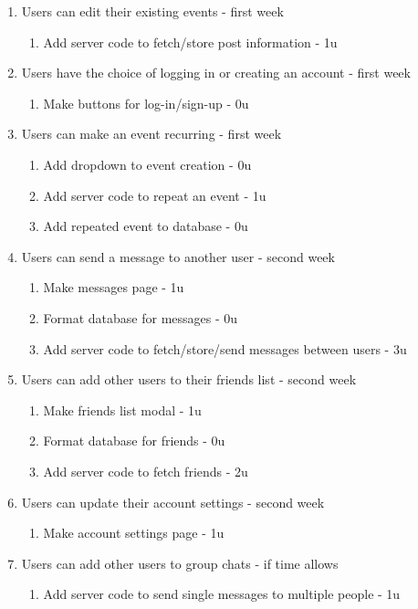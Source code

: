 \documentclass[a4paper]{article}
\begin{document}
\begin{enumerate}
\item Users can edit their existing events - first week
\begin{enumerate}
\item Add server code to fetch/store post information - 1u
\end{enumerate}

\item Users have the choice of logging in or creating an account - first week
\begin{enumerate}
\item Make buttons for log-in/sign-up - 0u
\end{enumerate}

\item Users can make an event recurring - first week
\begin{enumerate}
\item Add dropdown to event creation - 0u
\item Add server code to repeat an event - 1u
\item Add repeated event to database - 0u
\end{enumerate}

\item Users can send a message to another user - second week
\begin{enumerate}
\item Make messages page - 1u
\item Format database for messages - 0u
\item Add server code to fetch/store/send messages between users - 3u
\end{enumerate}

\item Users can add other users to their friends list - second week
\begin{enumerate}
\item Make friends list modal - 1u
\item Format database for friends - 0u
\item Add server code to fetch friends - 2u
\end{enumerate}

\item Users can update their account settings - second week
\begin{enumerate}
\item Make account settings page - 1u
\end{enumerate}

\item Users can add other users to group chats - if time allows
\begin{enumerate}
\item Add server code to send single messages to multiple people - 1u
\end{enumerate}


\end{enumerate}
\end{document}
